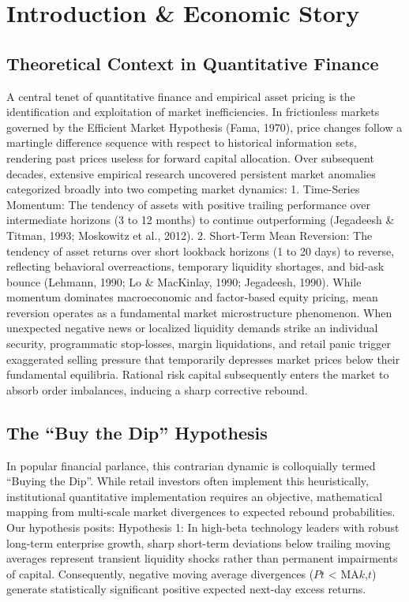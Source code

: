 \documentclass[12pt, a4paper]{article}
\begin{document}
\section{Introduction \& Economic Story}
\subsection{Theoretical Context in Quantitative Finance}
A central tenet of quantitative finance and empirical asset pricing is the identification and exploitation 
of market inefficiencies. In frictionless markets governed by the Efficient Market Hypothesis (Fama, 
1970), price changes follow a martingle difference sequence with respect to historical information sets, 
rendering past prices useless for forward capital allocation. Over subsequent decades, extensive empirical research uncovered persistent market anomalies categorized broadly into two competing market 
dynamics:
1. Time-Series Momentum: The tendency of assets with positive trailing performance over intermediate horizons (3 to 12 months) to continue outperforming (Jegadeesh \& Titman, 1993; Moskowitz 
et al., 2012).
2. Short-Term Mean Reversion:  The tendency of asset returns over short lookback horizons (1 to 
20 days) to reverse, reflecting behavioral overreactions, temporary liquidity shortages, and bid-ask 
bounce (Lehmann, 1990; Lo \& MacKinlay, 1990; Jegadeesh, 1990).
While momentum dominates macroeconomic and factor-based equity pricing, mean reversion operates 
as a fundamental market microstructure phenomenon. When unexpected negative news or localized 
liquidity demands strike an individual security, programmatic stop-losses, margin liquidations, and 
retail panic trigger exaggerated selling pressure that temporarily depresses market prices below their 
fundamental equilibria. Rational risk capital subsequently enters the market to absorb order imbalances, 
inducing a sharp corrective rebound.

\subsection{The ``Buy the Dip'' Hypothesis}
In popular financial parlance, this contrarian dynamic is colloquially termed ``Buying the Dip''. While 
retail investors often implement this heuristically, institutional quantitative implementation requires an 
objective, mathematical mapping from multi-scale market divergences to expected rebound probabilities.
Our hypothesis posits:
Hypothesis 1: In high-beta technology leaders with robust long-term enterprise growth, 
sharp short-term deviations below trailing moving averages represent transient liquidity 
shocks rather than permanent impairments of capital. Consequently, negative moving 
average divergences ($Pt$ < MA{$k$,$t$}) generate statistically significant positive expected 
next-day excess returns.
\end{document}
